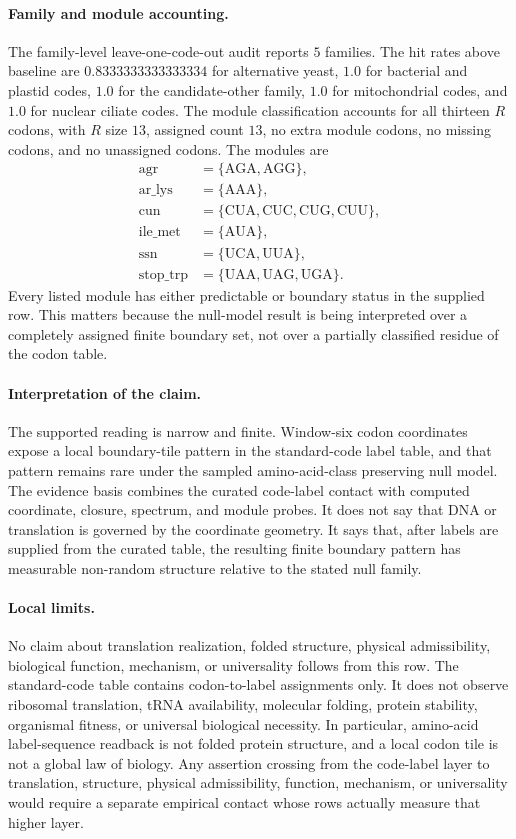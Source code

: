 \paragraph{Family and module accounting.}
The family-level leave-one-code-out audit reports $5$ families.  The hit rates above baseline are $0.8333333333333334$ for alternative yeast, $1.0$ for bacterial and plastid codes, $1.0$ for the candidate-other family, $1.0$ for mitochondrial codes, and $1.0$ for nuclear ciliate codes.  The module classification accounts for all thirteen $R$ codons, with $R$ size $13$, assigned count $13$, no extra module codons, no missing codons, and no unassigned codons.  The modules are
$$
\begin{aligned}
\mathrm{agr}&=\{\mathrm{AGA},\mathrm{AGG}\},\\
\mathrm{ar\_lys}&=\{\mathrm{AAA}\},\\
\mathrm{cun}&=\{\mathrm{CUA},\mathrm{CUC},\mathrm{CUG},\mathrm{CUU}\},\\
\mathrm{ile\_met}&=\{\mathrm{AUA}\},\\
\mathrm{ssn}&=\{\mathrm{UCA},\mathrm{UUA}\},\\
\mathrm{stop\_trp}&=\{\mathrm{UAA},\mathrm{UAG},\mathrm{UGA}\}.
\end{aligned}
$$
Every listed module has either predictable or boundary status in the supplied row.  This matters because the null-model result is being interpreted over a completely assigned finite boundary set, not over a partially classified residue of the codon table.

\paragraph{Interpretation of the claim.}
The supported reading is narrow and finite.  Window-six codon coordinates expose a local boundary-tile pattern in the standard-code label table, and that pattern remains rare under the sampled amino-acid-class preserving null model.  The evidence basis combines the curated code-label contact with computed coordinate, closure, spectrum, and module probes.  It does not say that DNA or translation is governed by the coordinate geometry.  It says that, after labels are supplied from the curated table, the resulting finite boundary pattern has measurable non-random structure relative to the stated null family.

\paragraph{Local limits.}
No claim about translation realization, folded structure, physical admissibility, biological function, mechanism, or universality follows from this row.  The standard-code table contains codon-to-label assignments only.  It does not observe ribosomal translation, tRNA availability, molecular folding, protein stability, organismal fitness, or universal biological necessity.  In particular, amino-acid label-sequence readback is not folded protein structure, and a local codon tile is not a global law of biology.  Any assertion crossing from the code-label layer to translation, structure, physical admissibility, function, mechanism, or universality would require a separate empirical contact whose rows actually measure that higher layer.